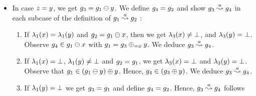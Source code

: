 {\begin{enumerate}
\begin{enumerate}
\begin{itemize}
    $\graph_1\pmovesto{\action}\graph_2$ :  
    \begin{enumerate}
    \item If $\labeling_1(\xvar)=\labeling_1(\yvar)$ and
      $\graph_2=\graph_1\delVar{\xvar}$, then we 
      get $\labeling_3(\xvar)=\undef$ and 
      $\labeling_3(\yvar)\nequals\undef$.
      Observe $\graph_3=\graph_1\delVar{\xvar}=\graph_2$ means 
      $\graph_3\pmovesto{\action}\graph_4$.
    \item If $\labeling_1(\xvar)\neq\undef$, 
      $\labeling_1(\yvar)=\undef$ and
      $\graph_2=\graph\delVar\xvar$ where $\graph=\graph_1\addEqVar{\xvar}{\yvar}$, 
      then we get $\labeling_3(\xvar)=\undef$ and 
      $\labeling_3(\yvar)\equals\undef$.
      Observe $\graph_2$ is in $(\graph_1\delVar{\xvar})\addVar{\yvar}$.
      This means 
      $\graph_4\in((\graph_1\delVar{\xvar})\addVar{\yvar})=(\graph_3\addVar{\yvar})$,
      and hence $\graph_3\pmovesto{\action}\graph_4$.
    \item If $\labeling_1(\xvar)=\undef$ we get $\graph_3=\graph_1$, and 
      $\graph_3\pmovesto{\action}\graph_4$
      follows from $\graph_1\pmovesto{\action}\graph_2$.
    \end{enumerate}
  \item In case $z=y$, we get $g_3=g_1\ominus{\ensuremath{y}}$.
    We define $g_4=g_2$ and show 
    $\graph_3\pmovesto{\action}\graph_4$ in each subcase of the definition of
    $\graph_1\pmovesto{\action}\graph_2$ :  
    \begin{enumerate}
    \item If $\labeling_1(\xvar)=\labeling_1(\yvar)$ and
      $\graph_2=\graph_1\delVar{\xvar}$, 
      then we get $\lambda_3(x)\neq\bot$, and
      $\lambda_3(y)=\bot$.
      Observe $g_4\in g_1\ominus{\ensuremath{x}}$ 
      with $g_1=g_3\oplus_{={x}}{y}$.
      We deduce $\graph_3\pmovesto{\action}\graph_4$.
    \item If $\labeling_1(\xvar)=\undef$, 
      $\lambda_1(y)\neq\bot$ and 
      $g_2=g_1$, we get $\labeling_3(\xvar)=\undef$ and
      $\labeling_3(\yvar)\equals\undef$.
      Observe that $g_1\in(g_1\ominus{\ensuremath{y}})\oplus{\ensuremath{y}}$.
      Hence, $g_4\in(g_3\oplus{\ensuremath{y}})$.
      We deduce $\graph_3\pmovesto{\action}\graph_4$.    
    \item If $\labeling_1(\yvar)=\undef$ we get $\graph_3=\graph_1$
      and define $g_4=g_2$.     
      Hence, $\graph_3\pmovesto{\action}\graph_4$ follows 

\end{enumerate}
\end{itemize}
\end{enumerate}
\end{enumerate}}
